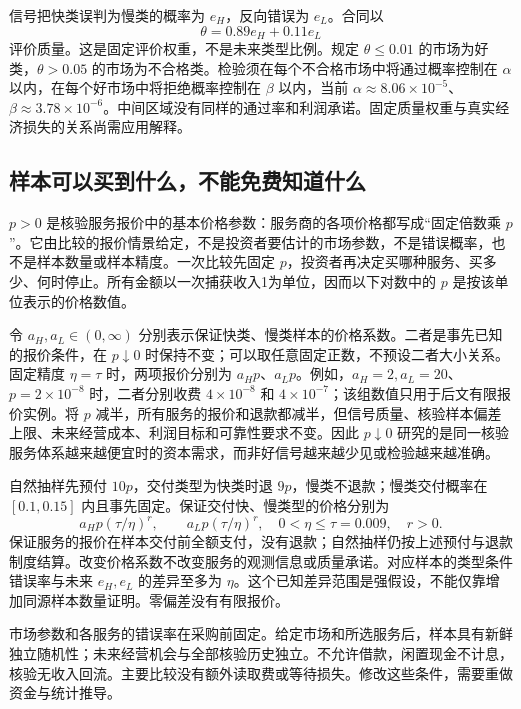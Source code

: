 \documentclass[UTF8,fontset=windows,11pt,a4paper]{ctexart}
\numberwithin{equation}{section}
\begin{document}
信号把快类误判为慢类的概率为 $e_H$，反向错误为 $e_L$。合同以
\begin{equation}
 \theta=0.89e_H+0.11e_L
\end{equation}
评价质量。这是固定评价权重，不是未来类型比例。规定 $\theta\le0.01$ 的市场为好类，$\theta>0.05$ 的市场为不合格类。检验须在每个不合格市场中将通过概率控制在 $\alpha$ 以内，在每个好市场中将拒绝概率控制在 $\beta$ 以内，当前 $\alpha\approx8.06\times10^{-5}$、$\beta\approx3.78\times10^{-6}$。中间区域没有同样的通过率和利润承诺。固定质量权重与真实经济损失的关系尚需应用解释。

\subsection{样本可以买到什么，不能免费知道什么}
$p>0$ 是核验服务报价中的基本价格参数：服务商的各项价格都写成“固定倍数乘 $p$”。它由比较的报价情景给定，不是投资者要估计的市场参数，不是错误概率，也不是样本数量或样本精度。一次比较先固定 $p$，投资者再决定买哪种服务、买多少、何时停止。所有金额以一次捕获收入1为单位，因而以下对数中的 $p$ 是按该单位表示的价格数值。

令 $a_H,a_L\in(0,\infty)$ 分别表示保证快类、慢类样本的价格系数。二者是事先已知的报价条件，在 $p\downarrow0$ 时保持不变；可以取任意固定正数，不预设二者大小关系。固定精度 $\eta=\tau$ 时，两项报价分别为 $a_Hp$、$a_Lp$。例如，$a_H=2,a_L=20$、$p=2\times10^{-8}$ 时，二者分别收费 $4\times10^{-8}$ 和 $4\times10^{-7}$；该组数值只用于后文有限报价实例。将 $p$ 减半，所有服务的报价和退款都减半，但信号质量、核验样本偏差上限、未来经营成本、利润目标和可靠性要求不变。因此 $p\downarrow0$ 研究的是同一核验服务体系越来越便宜时的资本需求，而非好信号越来越少见或检验越来越准确。

自然抽样先预付 $10p$，交付类型为快类时退 $9p$，慢类不退款；慢类交付概率在 $[0.1,0.15]$ 内且事先固定。保证交付快、慢类型的价格分别为
\begin{equation}
 a_Hp(\tau/\eta)^r,\qquad a_Lp(\tau/\eta)^r,
 \quad0<\eta\le\tau=0.009,\quad r>0.
\end{equation}
保证服务的报价在样本交付前全额支付，没有退款；自然抽样仍按上述预付与退款制度结算。改变价格系数不改变服务的观测信息或质量承诺。对应样本的类型条件错误率与未来 $e_H,e_L$ 的差异至多为 $\eta$。这个已知差异范围是强假设，不能仅靠增加同源样本数量证明。零偏差没有有限报价。

市场参数和各服务的错误率在采购前固定。给定市场和所选服务后，样本具有新鲜独立随机性；未来经营机会与全部核验历史独立。不允许借款，闲置现金不计息，核验无收入回流。主要比较没有额外读取费或等待损失。修改这些条件，需要重做资金与统计推导。
\end{document}
